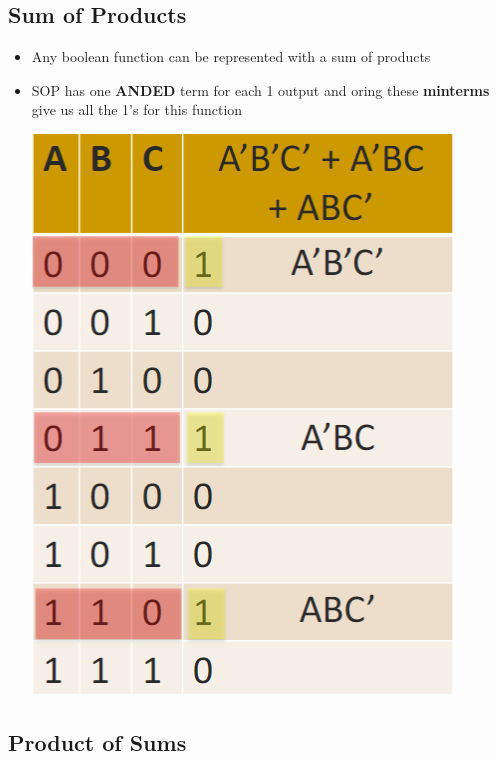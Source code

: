 \documentclass{article}
\begin{document}
\subsection{Sum of Products}

\begin{itemize}
    \item Any boolean function can be represented with a sum of products 
    
    \item SOP has one \textbf{ANDED} term for each 1 output and oring these \textbf{minterms} give us all the 1's for this function
    
    \includegraphics[scale=0.35]{images/minterms.png}
    
\end{itemize}


\subsection{Product of Sums}
\end{document}
